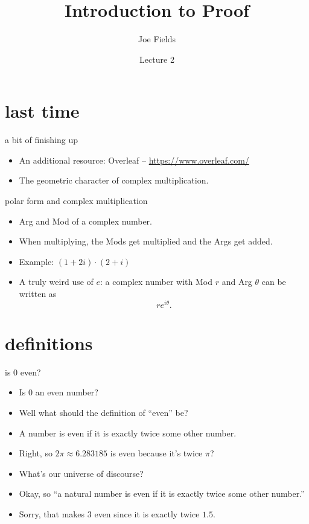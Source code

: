 \documentclass[landscape]{beamer}
\author{Joe Fields}
\title{Introduction to Proof}
\date{Lecture 2}
\institute[SCSU]{ {\tt fieldsj1@southernct.edu} }
\begin{document}
\begin{frame}[plain]
  \titlepage
\end{frame}

\section{last time}

\begin{frame}{a bit of finishing up}
\begin{itemize}
\item An additional resource: Overleaf -- \href{https://www.overleaf.com/}{https://www.overleaf.com/} \pause
\item The geometric character of complex multiplication. \pause
\end{itemize}
\end{frame}

\begin{frame}{polar form and complex multiplication}
\begin{itemize}
\item Arg and Mod of a complex number.\pause
\item When multiplying, the Mods get multiplied and the Args get added.\pause
\item Example: $(1+2i) \cdot (2+i)$\pause
\item A truly weird use of $e$:  \newline
a complex number with Mod $r$ and Arg $\theta$ can be written as \textellipsis \pause
\[ re^{i\theta}. \]
\end{itemize}
\end{frame}


\section{definitions}

\begin{frame}{is 0 even?}
\begin{itemize}
\item Is 0 an even number? \pause
\item Well what should the definition of ``even'' be? \pause
\item A number is even if it is exactly twice some other number. \pause
\item Right, so $2\pi \approx 6.283185$ is even because it's twice $\pi$? \pause
\item What's our universe of discourse? \pause
\item Okay, so ``a natural number is even if it is exactly twice some other number.'' \pause
\item Sorry, that makes $3$ even since it is exactly twice $1.5$.
\end{itemize}
\end{frame}
\end{document}
